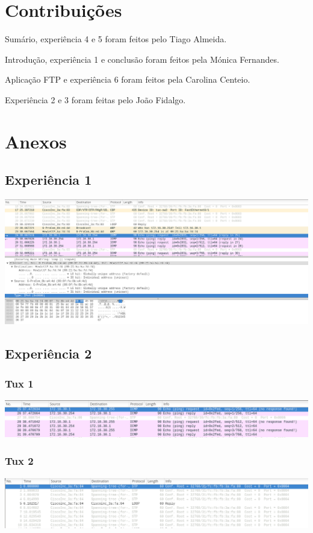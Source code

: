 \documentclass[a4paper]{article}
\begin{document}
\section{Contribuições}

Sumário, experiência 4 e 5 foram feitos pelo Tiago Almeida.

Introdução, experiência 1 e conclusão foram feitos pela Mónica Fernandes.

Aplicação FTP e experiência 6 foram feitos pela Carolina Centeio.

Experiência 2 e 3 foram feitas pelo João Fidalgo.

\newpage
\section{Anexos}
\subsection{Experiência 1}

\includegraphics[scale=0.35]{Exp1.png}

\subsection{Experiência 2}

\subsubsection{Tux 1}
\includegraphics[scale=0.35]{Exp2-tux1.png}

\subsubsection{Tux 2}
\includegraphics[scale=0.35]{Exp2-tux2.png}
\end{document}
